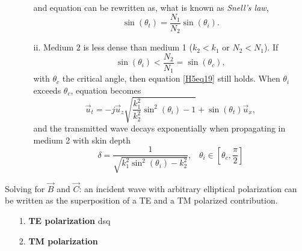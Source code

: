 \documentclass[a4paper, 10pt]{article}
\begin{document}
\begin{itemize}
\begin{itemize}
            and equation  can be rewritten as, what is known as \textit{Snell's law},
            \begin{equation}
                \sin(\theta_t) = \frac{N_1}{N_2}\sin(\theta_i). \label{H5eq20}
            \end{equation}
            \item[ii.] Medium 2 is less dense than medium 1 ($k_2 < k_1$ or $N_2 < N_1$). If 
            \begin{equation}
                \sin(\theta_i) < \frac{N_2}{N_1} = \sin(\theta_c), \label{H5eq21}
            \end{equation}
            with $\theta_c$ the critical angle, then equation \ref{H5eq19} still holds. When $\theta_i$ exceeds $\theta_c$, equation  becomes
            \begin{equation}
                \vec{u}_t = -j\vec{u}_z\sqrt{\frac{k^2_1}{k^2_2}\sin^2(\theta_i)-1} + \sin(\theta_t)\vec{u}_x, \label{H5eq22}
            \end{equation}
            and the transmitted wave decays exponentially when propagating in medium 2 with skin depth
            \begin{equation}
                \delta = \frac{1}{\sqrt{k^2_1\sin^2(\theta_i)-k^2_2}}, \;\;\; \theta_i \in [\theta_c, \frac{\pi}{2}] \label{H5eq23}
            \end{equation}
        \end{itemize}
    \end{itemize}
    Solving for $\vec{B}$ and $\vec{C}$: an incident wave with arbitrary elliptical polarization can be written as the superposition of a TE and a TM polarized contribution. 
    \begin{itemize}
        \item[1.] \textbf{TE polarization}
            dsq
        \item[2.] \textbf{TM polarization} 
    \end{itemize}


 
\end{document}
